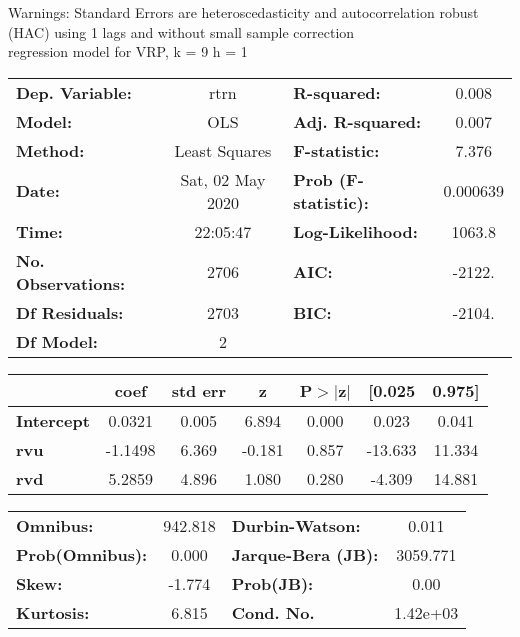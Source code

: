 Warnings: \newline
 [1] Standard Errors are heteroscedasticity and autocorrelation robust (HAC) using 1 lags and without small sample correction\\ 

regression model for VRP, k = 9 h = 1\begin{center}
\begin{tabular}{lclc}
\toprule
\textbf{Dep. Variable:}    &       rtrn       & \textbf{  R-squared:         } &     0.008   \\
\textbf{Model:}            &       OLS        & \textbf{  Adj. R-squared:    } &     0.007   \\
\textbf{Method:}           &  Least Squares   & \textbf{  F-statistic:       } &     7.376   \\
\textbf{Date:}             & Sat, 02 May 2020 & \textbf{  Prob (F-statistic):} &  0.000639   \\
\textbf{Time:}             &     22:05:47     & \textbf{  Log-Likelihood:    } &    1063.8   \\
\textbf{No. Observations:} &        2706      & \textbf{  AIC:               } &    -2122.   \\
\textbf{Df Residuals:}     &        2703      & \textbf{  BIC:               } &    -2104.   \\
\textbf{Df Model:}         &           2      & \textbf{                     } &             \\
\bottomrule
\end{tabular}
\begin{tabular}{lcccccc}
                   & \textbf{coef} & \textbf{std err} & \textbf{z} & \textbf{P$> |$z$|$} & \textbf{[0.025} & \textbf{0.975]}  \\
\midrule
\textbf{Intercept} &       0.0321  &        0.005     &     6.894  &         0.000        &        0.023    &        0.041     \\
\textbf{rvu}       &      -1.1498  &        6.369     &    -0.181  &         0.857        &      -13.633    &       11.334     \\
\textbf{rvd}       &       5.2859  &        4.896     &     1.080  &         0.280        &       -4.309    &       14.881     \\
\bottomrule
\end{tabular}
\begin{tabular}{lclc}
\textbf{Omnibus:}       & 942.818 & \textbf{  Durbin-Watson:     } &    0.011  \\
\textbf{Prob(Omnibus):} &   0.000 & \textbf{  Jarque-Bera (JB):  } & 3059.771  \\
\textbf{Skew:}          &  -1.774 & \textbf{  Prob(JB):          } &     0.00  \\
\textbf{Kurtosis:}      &   6.815 & \textbf{  Cond. No.          } & 1.42e+03  \\
\bottomrule
\end{tabular}
\end{center}

